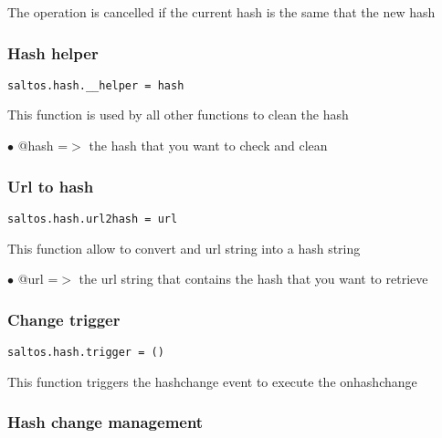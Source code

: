 \documentclass[a4paper]{article}
\begin{document}
The operation is cancelled if the current hash is the same that the new hash

\hypertarget{toc812}{}
\subsubsection{Hash helper}

\begin{lstlisting}
saltos.hash.__helper = hash
\end{lstlisting}

This function is used by all other functions to clean the hash

\begin{compactitem}
\item[\color{myblue}$\bullet$] @hash =$>$ the hash that you want to check and clean
\end{compactitem}

\hypertarget{toc813}{}
\subsubsection{Url to hash}

\begin{lstlisting}
saltos.hash.url2hash = url
\end{lstlisting}

This function allow to convert and url string into a hash string

\begin{compactitem}
\item[\color{myblue}$\bullet$] @url =$>$ the url string that contains the hash that you want to retrieve
\end{compactitem}

\hypertarget{toc814}{}
\subsubsection{Change trigger}

\begin{lstlisting}
saltos.hash.trigger = ()
\end{lstlisting}

This function triggers the hashchange event to execute the onhashchange

\hypertarget{toc815}{}
\subsubsection{Hash change management}
\end{document}
